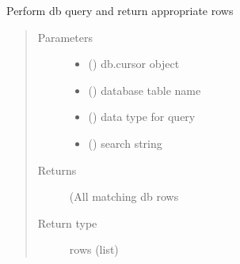 \documentclass[letterpaper,10pt,english]{sphinxmanual}
\begin{document}

\begin{fulllineitems}
\label{\detokenize{utils:bloxone.utils.db_query}}
\sphinxAtStartPar
Perform db query and return appropriate rows
\begin{quote}\begin{description}
\item[{Parameters}] \leavevmode\begin{itemize}
\item {} 
\sphinxAtStartPar
{} () \textendash{} db.cursor object

\item {} 
\sphinxAtStartPar
{} () \textendash{} database table name

\item {} 
\sphinxAtStartPar
{} () \textendash{} data type for query

\item {} 
\sphinxAtStartPar
{} () \textendash{} search string

\end{itemize}

\item[{Returns}] \leavevmode
\sphinxAtStartPar
(All matching db rows

\item[{Return type}] \leavevmode
\sphinxAtStartPar
rows (list)

\end{description}\end{quote}

\end{fulllineitems}

\end{document}
